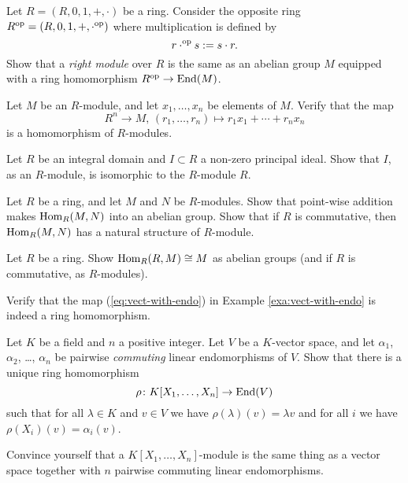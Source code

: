 \begin{exercise}Let $R=(R,0,1,+,\cdot)$ be a ring. Consider the opposite ring
$R^{\mathrm{op}}=(R,0,1,+,\cdot^{\mathrm{op}})$ where multiplication is defined by
\[
	r \cdot^{\mathrm{op}} s := s\cdot r.
\]
Show that  a \emph{right module} over $R$ is the same as an abelian group $M$ equipped with a ring homomorphism $R^{\mathrm{op}} \to \operatorname{\mathrm{End}}(M)$.
\end{exercise}

\begin{exercise}
Let $M$ be an $R$-module, and let $x_1,\ldots, x_n$ be elements of $M$. Verify that the map
\[
	R^n \to M,\, (r_1,\ldots, r_n) \mapsto r_1x_1 + \cdots + r_n x_n
\]
is a homomorphism of $R$-modules.
\end{exercise}

\begin{exercise}\label{exc:principal-ideal-in-domain}
Let $R$ be an integral domain and $I\subset R$ a non-zero principal ideal. Show that $I$, as an $R$-module, is isomorphic to the $R$-module $R$. 
\end{exercise}

\begin{exercise}Let $R$ be a ring, and let $M$ and $N$ be $R$-modules. Show that point-wise addition makes $\operatorname{Hom}_R(M,N)$ into an abelian group. Show that if $R$ is commutative, then $\operatorname{Hom}_R(M,N)$ has  a natural structure of $R$-module.
\end{exercise}

\begin{exercise}
Let $R$ be a ring. Show $\operatorname{Hom}_R(R,M) \cong M$ as abelian groups (and if $R$ is commutative, as $R$-modules).
\end{exercise}

\begin{exercise}\label{ex:vect-with-endo} Verify that the map (\ref{eq:vect-with-endo}) in Example \ref{exa:vect-with-endo} is indeed a ring homomorphism.
\end{exercise}

\begin{exercise}\label{exc:modules-over-multivariate-polynomial-ring}
Let $K$ be a field and $n$ a positive integer. Let $V$ be a $K$-vector space, and let $\alpha_1$, $\alpha_2$, \ldots, $\alpha_n$ be pairwise \emph{commuting} linear endomorphisms of $V$. Show that there is a unique ring homomorphism
\[
	\rho \colon K[X_1,\ldots,X_n] \to \operatorname{\mathrm{End}}(V)
\]
such that for all $\lambda \in K$ and $v\in V$ we have $\rho(\lambda)(v)=\lambda v$ and for all $i$ we have $\rho(X_i)(v) = \alpha_i(v)$.

Convince yourself that a $K[X_1,\ldots,X_n]$-module is the same thing as a vector space together with $n$ pairwise commuting linear endomorphisms.
\end{exercise}




